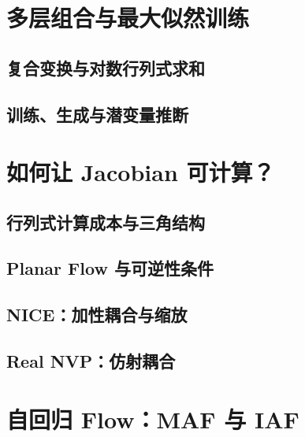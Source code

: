 \section{多层组合与最大似然训练}
\label{sec:flow-composition}
\contentplaceholder

\subsection{复合变换与对数行列式求和}
\label{subsec:flow-logdet}
\contentplaceholder

\subsection{训练、生成与潜变量推断}
\label{subsec:flow-workflows}
\contentplaceholder

\section{如何让 Jacobian 可计算？}
\label{sec:flow-jacobian}
\contentplaceholder

\subsection{行列式计算成本与三角结构}
\label{subsec:flow-triangular}
\contentplaceholder

\subsection{Planar Flow 与可逆性条件}
\label{subsec:flow-planar}
\contentplaceholder

\subsection{NICE：加性耦合与缩放}
\label{subsec:flow-nice}
\contentplaceholder

\subsection{Real NVP：仿射耦合}
\label{subsec:flow-real-nvp}
\contentplaceholder

\section{自回归 Flow：MAF 与 IAF}
\label{sec:flow-autoregressive}
\contentplaceholder

